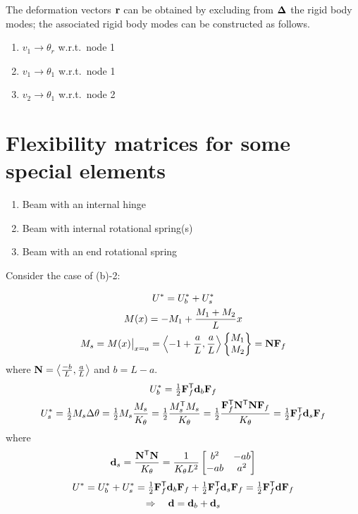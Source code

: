 The deformation vectors $\mathbf{r}$ can be obtained by excluding from $\bm{\Delta}$ the rigid body modes; the associated rigid body modes can be constructed as follows.
\begin{enumerate}[label=(\alph*)]
  \item $v_1\rightarrow\theta_r$ w.r.t.\ node 1
  \item $v_1\rightarrow\theta_1$ w.r.t.\ node 1
  \item $v_2\rightarrow\theta_1$ w.r.t.\ node 2
\end{enumerate}

\section{Flexibility matrices for some special elements}
\begin{enumerate}[label=(\alph*)]
  \item Beam with an internal hinge
  \item Beam with internal rotational spring(s)
  \item Beam with an end rotational spring
\end{enumerate}
\begin{fig}
  
\end{fig}
Consider the case of (b)-2:
\begin{fig}
  
\end{fig}
\begin{gather*}
  U^* = U^*_b + U^*_s\\
  M(x) = -M_1 + \frac{M_1+M_2}{L}x\\
  M_s = M(x)\big|_{x=a} = \Bigl\langle -1+\frac aL, \frac aL\Bigr\rangle\begin{Bmatrix}M_1\\ M_2\end{Bmatrix} = \mathbf{N}\mathbf{F}_f
\end{gather*}
where $\mathbf{N} = \bigl\langle\frac{-b}{L}, \frac aL\bigr\rangle$ and $b = L-a$.
\begin{gather*}
  U^*_b = \tfrac12\mathbf{F}_f^{\mathsf{T}}\mathbf{d}_b\mathbf{F}_f\\
  U^*_s = \tfrac12M_s\Delta\theta = \tfrac12M_s\frac{M_s}{K_\theta} = \tfrac12\frac{M_s^{\mathsf{T}} M_s}{K_\theta} = \tfrac12\frac{\mathbf{F}_f^{\mathsf{T}}\mathbf{N}^{\mathsf{T}}\mathbf{N}\mathbf{F}_f}{K_\theta} = \tfrac12\mathbf{F}_f^{\mathsf{T}}\mathbf{d}_s\mathbf{F}_f
\end{gather*}
where
\begin{equation*}
  \mathbf{d}_s = \frac{\mathbf{N}^{\mathsf{T}}\mathbf{N}}{K_\theta} = \frac{1}{K_\theta L^2}\begin{bmatrix}b^2 & -ab\\ -ab & a^2\end{bmatrix}
\end{equation*}
\begin{gather*}
  U^* = U^*_b + U^*_s = \tfrac12\mathbf{F}_f^{\mathsf{T}}\mathbf{d}_b\mathbf{F}_f + \tfrac12\mathbf{F}_f^{\mathsf{T}}\mathbf{d}_s\mathbf{F}_f = \tfrac12\mathbf{F}_f^{\mathsf{T}}\mathbf{d}\mathbf{F}_f\\
  \Rightarrow\quad \mathbf{d} = \mathbf{d}_b + \mathbf{d}_s
\end{gather*}


